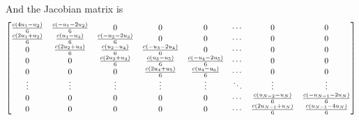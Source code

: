 And the Jacobian matrix is
\begin{equation}
  \begin{bmatrix}
    \frac{c\left( 4u_{1}-u_{2} \right)}{6} & \frac{c\left( -u_{1}-2u_{2} \right)}{6} & 0 & 0 & 0 & \cdots & 0 & 0 \\
    \frac{c\left( 2u_{1}+u_{2} \right)}{6} & \frac{c\left( u_{1}-u_{3} \right)}{6} &  \frac{c\left( -u_{2}-2u_{3} \right)}{6} & 0 & 0 & \cdots & 0 & 0 \\
    0 & \frac{c\left( 2u_{2}+u_{3} \right)}{6} & \frac{c\left( u_{2}-u_{4} \right)}{6} &  \frac{c\left( -u_{3}-2u_{4} \right)}{6} & 0 & \cdots & 0 & 0 \\
    0 & 0 & \frac{c\left( 2u_{3}+u_{4} \right)}{6} & \frac{c\left( u_{3}-u_{5} \right)}{6} &  \frac{c\left( -u_{4}-2u_{5} \right)}{6} & \cdots & 0 & 0 \\
    0 & 0 & 0 & \frac{c\left( 2u_{4}+u_{5} \right)}{6} & \frac{c\left( u_{4}-u_{6} \right)}{6} & \cdots & 0 & 0 \\
    \vdots & \vdots & \vdots & \vdots & \vdots & \ddots & \vdots & \vdots \\
    0 & 0 & 0 & 0 & 0 & \cdots & \frac{c\left( u_{N-2}-u_{N} \right)}{6} & \frac{c\left( -u_{N-1}-2u_{N} \right)}{6} \\
    0 & 0 & 0 & 0 & 0 & \cdots & \frac{c\left( 2u_{N-1}+u_{N} \right)}{6} & \frac{c\left( u_{N-1}-4u_{N} \right)}{6}
  \end{bmatrix}
\end{equation}
